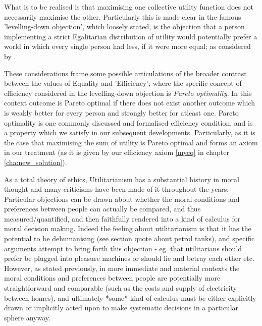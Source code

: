 What is to be realised is that maximising one collective utility function does not necessarily maximise the other.
Particularly this is made clear in the famous 'levelling-down objection', which loosely stated, is the objection that a person implementing a strict Egalitarian distribution of utility would potentially prefer a world in which every single person had less, if it were more equal; as considered by \cite{equalityandpriorityparfit, temkin_2003}.

These considerations frame some possible articulations of the broader contrast between the values of Equality and 'Efficiency'; where the specific concept of efficiency considered in the levelling-down objection is \textit{Pareto optimality}.
In this context outcome is Pareto optimal if there does not exist another outcome which is weakly better for every person and strongly better for atleast one.
Pareto optimality is one commonly discussed and formalised efficiency condition, and is a property which we satisfy in our subsequent developments.
Particularly, as it is the case that maximising the sum of utility is Pareto optimal and forms an axiom in our treatment (as it is given by our efficiency axiom \eqref{myeq} in chapter \ref{cha:new_solution}).

As a total theory of ethics, Utilitarianism has a substantial history in moral thought and many criticisms have been made of it throughout the years. Particular objections can be drawn about whether the moral conditions and preferences between people can actually be compared, and thus measured/quantified, and then faithfully rendered into a kind of calculus for moral decision making. Indeed the feeling about utilitarianism is that it has the potential to be dehumanising (see section quote about petrol tanks), and specific arguments attempt to bring forth this objection - eg. that utilitarians should prefer be plugged into pleasure machines \cite{GVK021647801} or should lie and betray each other \cite{kymlicka2002contemporary} etc.
However, as stated previously, in more immediate and material contexts the moral conditions and preferences between people are potentially more straightforward and comparable (such as the costs and supply of electricity between homes), and ultimately *some* kind of calculus must be either explicitly drawn or implicitly acted upon to make systematic decisions in a particular sphere anyway.

